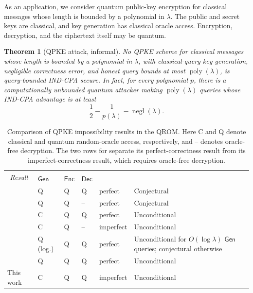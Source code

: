 \documentclass[11pt]{article}
\newtheorem{theorem}{Theorem}[section]
\newcommand{\poly}{\operatorname{poly}}
\newcommand{\negl}{\operatorname{negl}}
\newcommand{\Gen}{\mathsf{Gen}}
\newcommand{\Enc}{\mathsf{Enc}}
\newcommand{\Dec}{\mathsf{Dec}}
\begin{document}
As an application, we consider quantum public-key encryption for classical
messages whose length is bounded by a polynomial in \(\lambda\). The public
and secret keys are classical, and key generation has classical oracle
access. Encryption, decryption, and the ciphertext itself may be quantum.

\begin{theorem}[QPKE attack, informal]
\label{thm:informal-qpke}
No QPKE scheme for classical messages whose length is bounded by a polynomial
in \(\lambda\), with
classical-query key generation, negligible correctness error, and honest
query bounds at most \(\poly(\lambda)\), is query-bounded IND-CPA secure. In
fact, for every polynomial \(p\), there is a computationally unbounded quantum
attacker making \(\poly(\lambda)\) queries whose IND-CPA advantage is at least
\[
  \frac12-\frac{1}{p(\lambda)}-\negl(\lambda).
\]
\end{theorem}

\begin{table}[t]
  \centering
  \small
  \renewcommand{\arraystretch}{1.15}
  \begin{tabularx}{\textwidth}{@{}l*{3}{>{\centering\arraybackslash}p{1.45cm}}>{\centering\arraybackslash}p{1.75cm}>{\raggedright\arraybackslash}X@{}}
    \toprule
    \multicolumn{1}{c}{\multirow{2}{*}{\textit{Result}}}
      & \multicolumn{3}{c}{\textit{Oracle access}}
      & \multicolumn{1}{c}{\multirow{2}{*}{\textit{Correctness}}}
      & \multicolumn{1}{c}{\multirow{2}{*}{\textit{Status}}} \\
    \cmidrule(lr){2-4}
      & \(\Gen\) & \(\Enc\) & \(\Dec\) & & \\
    \midrule
    \cite{AustrinEtAl22}
      & Q & Q & Q & perfect & Conjectural \\
    \cite{BouazizEtAl24}
      & Q & Q & -- & perfect & Conjectural \\
    \cite{LiEtAl24}
      & C & Q & Q & perfect & Unconditional \\
    \cite{LiEtAl24}
      & C & Q & -- & imperfect & Unconditional \\
    \cite{LiEtAl25}
      & Q (log.) & Q & Q & perfect
      & Unconditional for \(O(\log\lambda)\) \(\Gen\) queries; conjectural
        otherwise \\
    \cite{LiEtAl26PKE}
      & Q & Q & Q & perfect & Unconditional \\
    This work
      & C & Q & Q & imperfect & Unconditional \\
    \bottomrule
  \end{tabularx}
  \caption{Comparison of QPKE impossibility results in the QROM.  Here C and
  Q denote classical and quantum random-oracle access, respectively, and
  -- denotes oracle-free decryption.  The two rows for
  \cite{LiEtAl24} separate its perfect-correctness result from its
  imperfect-correctness result, which requires oracle-free decryption.}
  \label{tab:qpke-comparison}
\end{table}
\end{document}
